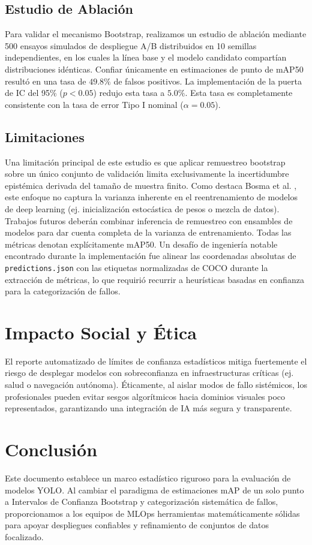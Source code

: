 \documentclass[conference]{IEEEtran}
\begin{document}
\subsection{Estudio de Ablación}
Para validar el mecanismo Bootstrap, realizamos un estudio de ablación mediante 500 ensayos simulados de despliegue A/B distribuidos en 10 semillas independientes, en los cuales la línea base y el modelo candidato compartían distribuciones idénticas. Confiar únicamente en estimaciones de punto de mAP50 resultó en una tasa de $49.8\%$ de falsos positivos. La implementación de la puerta de IC del 95\% ($p < 0.05$) redujo esta tasa a $5.0\%$. Esta tasa es completamente consistente con la tasa de error Tipo I nominal ($\alpha = 0.05$).

\subsection{Limitaciones}
Una limitación principal de este estudio es que aplicar remuestreo bootstrap sobre un único conjunto de validación limita exclusivamente la incertidumbre epistémica derivada del tamaño de muestra finito. Como destaca Bosma et al. \cite{bosma2024statistical}, este enfoque no captura la varianza inherente en el reentrenamiento de modelos de deep learning (ej. inicialización estocástica de pesos o mezcla de datos). Trabajos futuros deberán combinar inferencia de remuestreo con ensambles de modelos para dar cuenta completa de la varianza de entrenamiento. Todas las métricas denotan explícitamente mAP50. Un desafío de ingeniería notable encontrado durante la implementación fue alinear las coordenadas absolutas de \texttt{predictions.json} con las etiquetas normalizadas de COCO durante la extracción de métricas, lo que requirió recurrir a heurísticas basadas en confianza para la categorización de fallos.

\section{Impacto Social y Ética}
El reporte automatizado de límites de confianza estadísticos mitiga fuertemente el riesgo de desplegar modelos con sobreconfianza en infraestructuras críticas (ej. salud o navegación autónoma). Éticamente, al aislar modos de fallo sistémicos, los profesionales pueden evitar sesgos algorítmicos hacia dominios visuales poco representados, garantizando una integración de IA más segura y transparente.

\section{Conclusión}
Este documento establece un marco estadístico riguroso para la evaluación de modelos YOLO. Al cambiar el paradigma de estimaciones mAP de un solo punto a Intervalos de Confianza Bootstrap y categorización sistemática de fallos, proporcionamos a los equipos de MLOps herramientas matemáticamente sólidas para apoyar despliegues confiables y refinamiento de conjuntos de datos focalizado.
\end{document}
